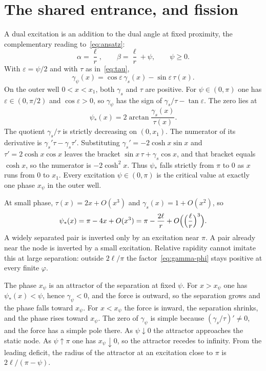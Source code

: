 \documentclass[a4paper]{article}
\begin{document}
\section{The shared entrance, and fission}
\label{sec:fission}

A dual excitation is an addition to the dual angle at fixed proximity, the complementary reading to~\eqref{eq:ansatz}:
\begin{equation}
\label{eq:dual-ansatz}
\alpha=\frac{\ell}{r},
\qquad
\beta=\frac{\ell}{r}+\psi,
\qquad
\psi\ge 0.
\end{equation}
With \(\varepsilon=\psi/2\) and with \(\tau\) as in~\eqref{eq:tau},
\begin{equation}
\label{eq:gamma-psi}
\gamma_\psi(x)
  =\cos\varepsilon\,\gamma_s(x)-\sin\varepsilon\,\tau(x).
\end{equation}
On the outer well \(0<x<x_1\), both \(\gamma_s\) and \(\tau\) are positive. For \(\psi\in(0,\pi)\) one has \(\varepsilon\in(0,\pi/2)\) and \(\cos\varepsilon>0\), so \(\gamma_\psi\) has the sign of \(\gamma_s/\tau-\tan\varepsilon\). The zero lies at
\begin{equation}
\label{eq:psi-star}
\psi_*(x)=2\arctan\frac{\gamma_s(x)}{\tau(x)}.
\end{equation}
The quotient \(\gamma_s/\tau\) is strictly decreasing on \((0,x_1)\). The numerator of its derivative is \(\gamma_s'\tau-\gamma_s\tau'\). Substituting \(\gamma_s'=-2\cosh x\sin x\) and \(\tau'=2\cosh x\cos x\) leaves the bracket \(\sin x\,\tau+\gamma_s\cos x\), and that bracket equals \(\cosh x\), so the numerator is \(-2\cosh^{2}x\). Thus \(\psi_*\) falls strictly from \(\pi\) to \(0\) as \(x\) runs from \(0\) to \(x_1\). Every excitation \(\psi\in(0,\pi)\) is the critical value at exactly one phase \(x_\psi\) in the outer well.

At small phase, \(\tau(x)=2x+O(x^{3})\) and \(\gamma_s(x)=1+O(x^{2})\), so
\[
\psi_*(x)=\pi-4x+O(x^{3})=\pi-\frac{2\ell}{r}+O\Bigl(\Bigl(\frac{\ell}{r}\Bigr)^{3}\Bigr).
\]
A widely separated pair is inverted only by an excitation near \(\pi\). A pair already near the node is inverted by a small excitation. Relative rapidity cannot imitate this at large separation: outside \(2\ell/\pi\) the factor~\eqref{eq:gamma-phi} stays positive at every finite \(\varphi\).

The phase \(x_\psi\) is an attractor of the separation at fixed \(\psi\). For \(x>x_\psi\) one has \(\psi_*(x)<\psi\), hence \(\gamma_\psi<0\), and the force is outward, so the separation grows and the phase falls toward \(x_\psi\). For \(x<x_\psi\) the force is inward, the separation shrinks, and the phase rises toward \(x_\psi\). The zero of \(\gamma_\psi\) is simple because \((\gamma_s/\tau)'\neq 0\), and the force has a simple pole there. As \(\psi\downarrow 0\) the attractor approaches the static node. As \(\psi\uparrow\pi\) one has \(x_\psi\downarrow 0\), so the attractor recedes to infinity. From the leading deficit, the radius of the attractor at an excitation close to \(\pi\) is \(2\ell/(\pi-\psi)\).
\end{document}
